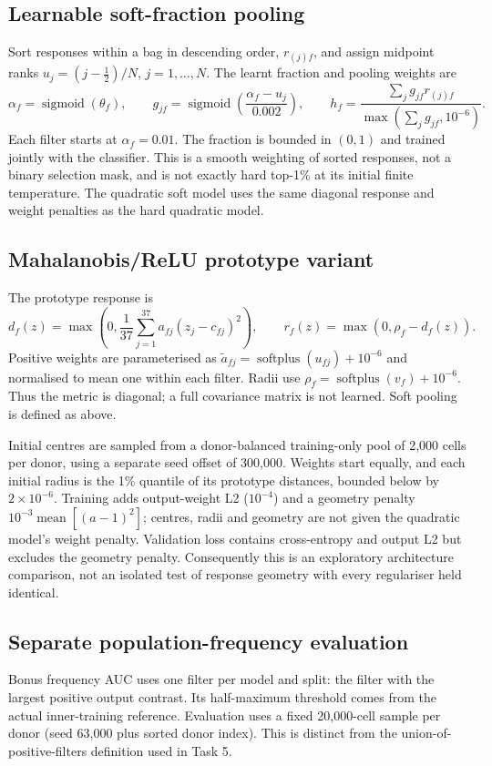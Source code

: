 \documentclass[11pt,a4paper]{article}
\begin{document}
\subsection{Learnable soft-fraction pooling}
Sort responses within a bag in descending order, $r_{(j)f}$, and assign midpoint ranks $u_j=(j-\tfrac12)/N$, $j=1,\ldots,N$. The learnt fraction and pooling weights are
\[
\alpha_f=\operatorname{sigmoid}(\theta_f),\qquad
g_{jf}=\operatorname{sigmoid}\left(\frac{\alpha_f-u_j}{0.002}\right),\qquad
h_f=\frac{\sum_jg_{jf}r_{(j)f}}{\max(\sum_jg_{jf},10^{-6})}.
\]
Each filter starts at $\alpha_f=0.01$. The fraction is bounded in $(0,1)$ and trained jointly with the classifier. This is a smooth weighting of sorted responses, not a binary selection mask, and is not exactly hard top-1\% at its initial finite temperature. The quadratic soft model uses the same diagonal response and weight penalties as the hard quadratic model.

\subsection{Mahalanobis/ReLU prototype variant}
The prototype response is
\[
d_f(z)=\max\left(0,\frac1{37}\sum_{j=1}^{37}a_{fj}(z_j-c_{fj})^2\right),
\qquad r_f(z)=\max(0,\rho_f-d_f(z)).
\]
Positive weights are parameterised as $\tilde a_{fj}=\operatorname{softplus}(u_{fj})+10^{-6}$ and normalised to mean one within each filter. Radii use $\rho_f=\operatorname{softplus}(v_f)+10^{-6}$. Thus the metric is diagonal; a full covariance matrix is not learned. Soft pooling is defined as above.

Initial centres are sampled from a donor-balanced training-only pool of 2,000 cells per donor, using a separate seed offset of 300,000. Weights start equally, and each initial radius is the 1\% quantile of its prototype distances, bounded below by $2\times10^{-6}$. Training adds output-weight L2 ($10^{-4}$) and a geometry penalty $10^{-3}\operatorname{mean}[(a-1)^2]$; centres, radii and geometry are not given the quadratic model's weight penalty. Validation loss contains cross-entropy and output L2 but excludes the geometry penalty. Consequently this is an exploratory architecture comparison, not an isolated test of response geometry with every regulariser held identical.

\subsection{Separate population-frequency evaluation}
Bonus frequency AUC uses one filter per model and split: the filter with the largest positive output contrast. Its half-maximum threshold comes from the actual inner-training reference. Evaluation uses a fixed 20,000-cell sample per donor (seed 63,000 plus sorted donor index). This is distinct from the union-of-positive-filters definition used in Task 5.
\end{document}
